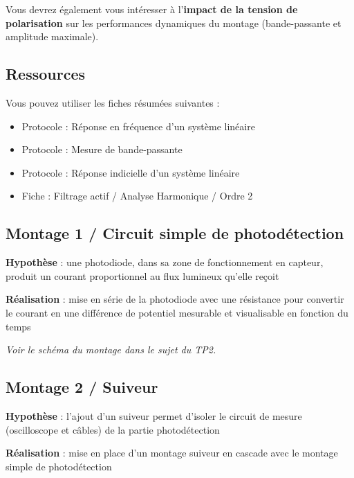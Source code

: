 \bigskip

Vous devrez également vous intéresser à l'\textbf{impact de la tension de polarisation} sur les performances dynamiques du montage (bande-passante et amplitude maximale).

\subsection{Ressources}

Vous pouvez utiliser les fiches résumées suivantes : 

\begin{itemize}	
	\item Protocole : Réponse en fréquence d'un système linéaire
	\item Protocole : Mesure de bande-passante
	\item Protocole : Réponse indicielle d'un système linéaire
	\item Fiche : Filtrage actif / Analyse Harmonique / Ordre 2
\end{itemize}

\bigskip

\subsection{Montage 1 / Circuit simple de photodétection}

\textbf{Hypothèse} : une photodiode, dans sa zone de fonctionnement en capteur, produit un courant proportionnel au flux lumineux qu'elle reçoit

\textbf{Réalisation} : mise en série de la photodiode avec une résistance pour convertir le courant en une différence de potentiel mesurable et visualisable en fonction du temps

\bigskip

\textit{Voir le schéma du montage dans le sujet du TP2.}

\newpage
\subsection{Montage 2 / Suiveur}

\textbf{Hypothèse} : l'ajout d'un suiveur permet d'isoler le circuit de mesure (oscilloscope et câbles) de la partie photodétection

\textbf{Réalisation} : mise en place d'un montage suiveur en cascade avec le montage simple de photodétection

